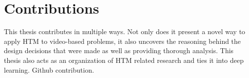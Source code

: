 \section{Contributions}
This thesis contributes in multiple ways. Not only does it present a novel way to apply HTM to video-based problems, it also uncovers the reasoning behind the design decisions that were made as well as providing thorough analysis. This thesis also acts as an organization of HTM related research and ties it into deep learning.
Github contribution.
